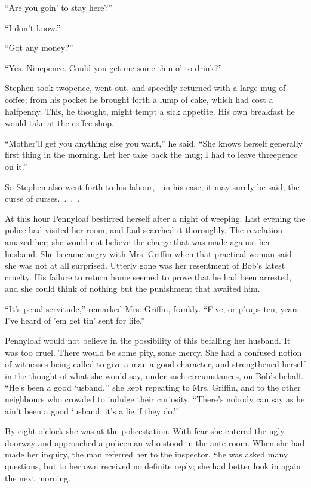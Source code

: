 ``Are you goin' to stay here?''

``I don't know.''

``Got any money?''

``Yes. Ninepence. Could you get me some thin o' to drink?''

Stephen took twopence, went out, and speedily returned with a large mug
of coffee; from his pocket he brought forth a lump of cake, which had
cost a halfpenny. This, he thought, might tempt a sick appetite. His own
breakfast he would take at the coffee-shop.

``Mother'll get you anything else you want,'' he said. ``She knows
herself generally first thing in the morning. Let her take back the mug;
I had to leave threepence on it.''

So Stephen also went forth to his labour,---in his case, it may surely
be said, the curse of curses{.~.~.~.}

At this hour Pennyloaf bestirred herself {}after a night of weeping.
Last evening the police had visited her room, and Lad searched it
thoroughly. The revelation amazed her; she would not believe the charge
that was made against her husband. She became angry with Mrs. Griffin
when that practical woman said she was not at all surprised. Utterly
gone was her resentment of Bob's latest cruelty. His failure to return
home seemed to prove that he had been arrested, and she could think of
nothing but the punishment that awaited him.

``It's penal servitude,'' remarked Mrs. Griffin, frankly. ``Five, or
p'raps ten, years. I've heard of 'em get tin' sent for life.''

Pennyloaf would not believe in the possibility of this befalling her
husband. It was too cruel. There would be some pity, some mercy. She had
a confused notion of witnesses being called to give a man a good
character, and strengthened herself in the thought of what she would
say, under such circumstances, on Bob's behalf. ``He's been a good
`usband,'' she kept repeating to Mrs. Griffin, and to the other
neighbours who crowded to indulge their curiosity. ``There's nobody can
say as he ain't been a good `usband; it's a lie if they do.''

{}By eight o'clock she was at the policestation. With fear she entered
the ugly doorway and approached a policeman who stood in the ante-room.
When she had made her inquiry, the man referred her to the inspector.
She was asked many questions, but to her own received no definite reply;
she had better look in again the next morning.

